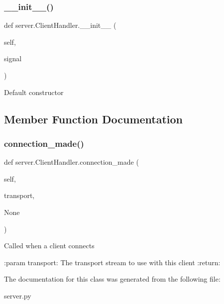\subsubsection{\texorpdfstring{\+\_\+\+\_\+init\+\_\+\+\_\+()}{\_\_init\_\_()}}
{\footnotesize\ttfamily def server.\+Client\+Handler.\+\_\+\+\_\+init\+\_\+\+\_\+ (\begin{DoxyParamCaption}\item[{}]{self,  }\item[{}]{signal }\end{DoxyParamCaption})}

\begin{DoxyVerb}Default constructor
\end{DoxyVerb}
 

\subsection{Member Function Documentation}
\mbox{\label{classserver_1_1ClientHandler_a3f1571d4b04ad740c031c3bafaf1a252}} 
\subsubsection{\texorpdfstring{connection\+\_\+made()}{connection\_made()}}
{\footnotesize\ttfamily def server.\+Client\+Handler.\+connection\+\_\+made (\begin{DoxyParamCaption}\item[{}]{self,  }\item[{}]{transport,  }\item[{}]{None }\end{DoxyParamCaption})}

\begin{DoxyVerb}Called when a client connects

:param transport: The transport stream to use with this client
:return:
\end{DoxyVerb}
 

The documentation for this class was generated from the following file\+:\begin{DoxyCompactItemize}
\item 
server.\+py\end{DoxyCompactItemize}
